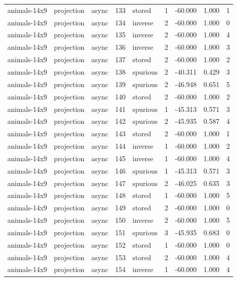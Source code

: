 \begin{tabular}{lllrlrrrr}
animals-14x9 & projection & async & 133 & stored & 1 & -60.000 & 1.000 & 1 \\
animals-14x9 & projection & async & 134 & inverse & 2 & -60.000 & 1.000 & 0 \\
animals-14x9 & projection & async & 135 & inverse & 2 & -60.000 & 1.000 & 4 \\
animals-14x9 & projection & async & 136 & inverse & 2 & -60.000 & 1.000 & 3 \\
animals-14x9 & projection & async & 137 & stored & 2 & -60.000 & 1.000 & 2 \\
animals-14x9 & projection & async & 138 & spurious & 2 & -40.311 & 0.429 & 3 \\
animals-14x9 & projection & async & 139 & spurious & 2 & -46.948 & 0.651 & 5 \\
animals-14x9 & projection & async & 140 & stored & 2 & -60.000 & 1.000 & 2 \\
animals-14x9 & projection & async & 141 & spurious & 1 & -45.313 & 0.571 & 3 \\
animals-14x9 & projection & async & 142 & spurious & 2 & -45.935 & 0.587 & 4 \\
animals-14x9 & projection & async & 143 & stored & 2 & -60.000 & 1.000 & 1 \\
animals-14x9 & projection & async & 144 & inverse & 1 & -60.000 & 1.000 & 2 \\
animals-14x9 & projection & async & 145 & inverse & 1 & -60.000 & 1.000 & 4 \\
animals-14x9 & projection & async & 146 & spurious & 1 & -45.313 & 0.571 & 3 \\
animals-14x9 & projection & async & 147 & spurious & 2 & -46.025 & 0.635 & 3 \\
animals-14x9 & projection & async & 148 & stored & 1 & -60.000 & 1.000 & 5 \\
animals-14x9 & projection & async & 149 & stored & 2 & -60.000 & 1.000 & 0 \\
animals-14x9 & projection & async & 150 & inverse & 2 & -60.000 & 1.000 & 5 \\
animals-14x9 & projection & async & 151 & spurious & 3 & -45.935 & 0.683 & 0 \\
animals-14x9 & projection & async & 152 & stored & 1 & -60.000 & 1.000 & 0 \\
animals-14x9 & projection & async & 153 & stored & 2 & -60.000 & 1.000 & 4 \\
animals-14x9 & projection & async & 154 & inverse & 1 & -60.000 & 1.000 & 4 \\

\end{tabular}
